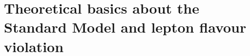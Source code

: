 \documentclass[12pt,twoside]{report}
\begin{document}


%

\tableofcontents

\chapter{Theoretical basics about the Standard Model and lepton flavour violation}


%



 
\end{document}
